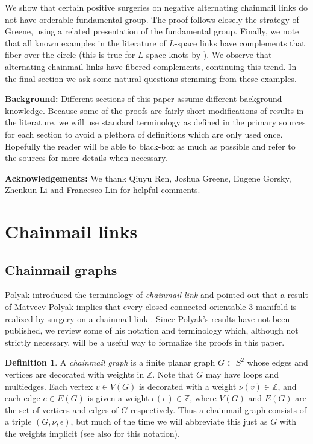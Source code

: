 \documentclass{amsart}
\theoremstyle{definition}
\newtheorem{definition}[theorem]{Definition}
\theoremstyle{remark}
\begin{document}
We show that certain positive surgeries on negative alternating chainmail links do not have orderable fundamental group. The proof follows closely the strategy of Greene, using a related presentation of the fundamental group. Finally, we note that all known examples in the literature of $L$-space links have complements that fiber over the circle (this is true for $L$-space knots by \cite{MR2357503}). We observe that alternating chainmail links have fibered complements, continuing this trend. In the final section we ask some natural questions stemming from these examples. 

{\bf Background:} Different sections of this paper assume different background knowledge. Because some of the proofs are fairly short modifications of results in the literature, we will use standard terminology as defined in the primary sources for each section to avoid a plethora of definitions which are only used once. Hopefully the reader will be able to black-box as much as possible and refer to the sources for more details when necessary. 

{\bf Acknowledgements:} We thank Qiuyu Ren, Joshua Greene, Eugene Gorsky, Zhenkun Li and Francesco Lin for helpful comments. 

\section{Chainmail links}

\subsection{Chainmail graphs}

Polyak introduced the terminology of {\it chainmail link} \cite{Polyak} and pointed out that a result of Matveev-Polyak implies that every closed connected orientable 3-manifold is realized by surgery on a chainmail link \cite{MR1266062}. Since Polyak's results have not been published, we review some of his notation and terminology which, although not strictly necessary, will be a useful way to formalize the proofs in this paper. 

\begin{definition} A {\it chainmail graph} is a finite planar graph $G \subset S^2$ whose edges and vertices are decorated with weights in $\mathbb{Z}$. Note that $G$ may have loops and multiedges. Each vertex $v\in V(G)$ is decorated with a weight $\nu(v)\in \mathbb{Z}$, and each edge $e \in E(G)$ is given a weight $\epsilon(e)\in\mathbb{Z}$, where $V(G)$ and $E(G)$ are the set of vertices and edges of $G$ respectively. Thus a chainmail graph consists of a triple $(G,\nu, \epsilon)$, but much of the time we will abbreviate this just as $G$ with the weights implicit (see also \cite{arXiv:2110.13949} for this notation). 
\end{definition}
\end{document}
